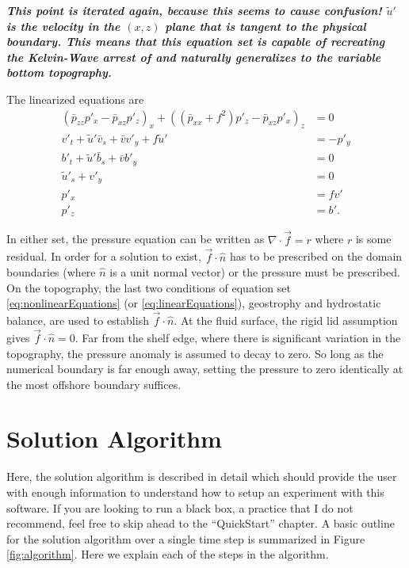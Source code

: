 \documentclass[12pt]{memoir}
\begin{document}
\textbf{\textit{This point is iterated again, because this seems to cause confusion! $\tilde{u}'$ is the velocity in the $(x,z)$ plane that is tangent to the physical boundary. This means that this equation set is capable of recreating the Kelvin-Wave arrest of \citet{HoggEtAl2011} and naturally generalizes to the variable bottom topography.}}

The linearized equations are
\begin{subequations}
\begin{align}
\left( \bar{p}_{zz} p'_{x} - \bar{p}_{xz}p'_{z}\right)_x + \left( (\bar{p}_{xx} + f^2)p'_{z} - \bar{p}_{xz}p'_{x}\right)_z &= 0 \\
v'_t + \tilde{u}'\bar{v}_s + \bar{v}v'_y + f\tilde{u}' &= -p'_y \\
b'_t + \tilde{u}'\bar{b}_s + \bar{v}b'_y &= 0 \\
\tilde{u}'_s + v'_y &= 0 \\
p'_x &= fv' \\
p'_z &= b'.
\end{align}\label{eq:linearEquations}
\end{subequations}

In either set, the pressure equation can be written as $\nabla \cdot \vec{f} = r$ where $r$ is some residual. In order for a solution to exist, $\vec{f}\cdot\hat{n}$ has to be prescribed on the domain boundaries (where $\hat{n}$ is a unit normal vector) or the pressure must be prescribed. On the topography, the last two conditions of equation set \eqref{eq:nonlinearEquations} (or \eqref{eq:linearEquations}), geostrophy and hydrostatic balance, are used to establish $\vec{f}\cdot\hat{n}$. At the fluid surface, the rigid lid assumption gives $\vec{f}\cdot \hat{n} = 0$. Far from the shelf edge, where there is significant variation in the topography, the pressure anomaly is assumed to decay to zero. So long as the numerical boundary is far enough away, setting the pressure to zero identically at the most offshore boundary suffices. 


\chapter{Solution Algorithm}
Here, the solution algorithm is described in detail which should provide the user with enough information to understand how to setup an experiment with this software. If you are looking to run a black box, a practice that I do not recommend, feel free to skip ahead to the ``QuickStart'' chapter. A basic outline for the solution algorithm over a single time step is summarized in Figure \ref{fig:algorithm}. Here we explain each of the steps in the algorithm.
\end{document}
